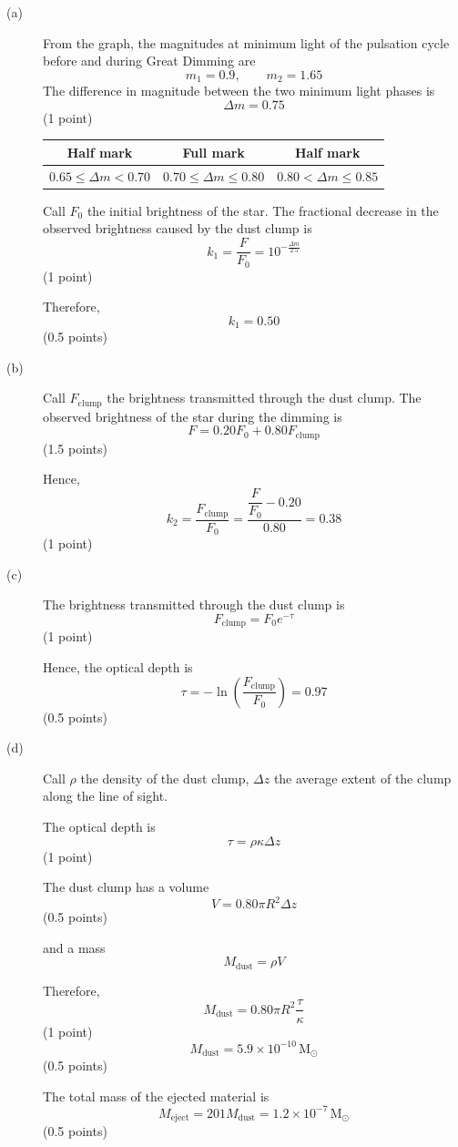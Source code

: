 \begin{description}
\item[(a)] From the graph, the magnitudes at minimum light of the pulsation
  cycle before and during Great Dimming are
  \[ m_1 = 0.9, \qquad m_2 = 1.65 \]
  The difference in magnitude between the two minimum light phases is
  \[ \Delta m = 0.75 \]
  \hfill(1 point)

  \begin{center}
  \begin{tabular}{ccc}
  \toprule
  Half mark & Full mark & Half mark \\
  \midrule
  $0.65 \le \Delta m < 0.70$ & $0.70 \le \Delta m \le 0.80$ &
  $0.80 < \Delta m \le 0.85$ \\
  \bottomrule
  \end{tabular}
  \end{center}

  Call $F_0$ the initial brightness of the star. The fractional decrease in
  the observed brightness caused by the dust clump is
  \[ k_1 = \frac{F}{F_0} = 10^{-\frac{\Delta m}{2.5}} \]
  \hfill(1 point)

  Therefore,
  \[ k_1 = 0.50 \]
  \hfill(0.5 points)

\item[(b)] Call $F_{\mathrm{clump}}$ the brightness transmitted through the
  dust clump. The observed brightness of the star during the dimming is
  \[ F = 0.20F_0 + 0.80F_{\mathrm{clump}} \]
  \hfill(1.5 points)

  Hence,
  \[ k_2 = \frac{F_{\mathrm{clump}}}{F_0}
         = \frac{\dfrac{F}{F_0} - 0.20}{0.80} = 0.38 \]
  \hfill(1 point)

\item[(c)] The brightness transmitted through the dust clump is
  \[ F_{\mathrm{clump}} = F_0 e^{-\tau} \]
  \hfill(1 point)

  Hence, the optical depth is
  \[ \tau = -\ln\left(\frac{F_{\mathrm{clump}}}{F_0}\right) = 0.97 \]
  \hfill(0.5 points)

\item[(d)] Call $\rho$ the density of the dust clump, $\Delta z$ the average
  extent of the clump along the line of sight.

  The optical depth is
  \[ \tau = \rho\kappa\Delta z \]
  \hfill(1 point)

  The dust clump has a volume
  \[ V = 0.80\pi R^2 \Delta z \]
  \hfill(0.5 points)

  and a mass
  \[ M_{\mathrm{dust}} = \rho V \]

  Therefore,
  \[ M_{\mathrm{dust}} = 0.80\pi R^2 \frac{\tau}{\kappa} \]
  \hfill(1 point)
  \[ M_{\mathrm{dust}} = 5.9 \times 10^{-10}\,\mathrm{M}_\odot \]
  \hfill(0.5 points)

  The total mass of the ejected material is
  \[ M_{\mathrm{eject}} = 201 M_{\mathrm{dust}}
     = 1.2 \times 10^{-7}\,\mathrm{M}_\odot \]
  \hfill(0.5 points)
\end{description}

